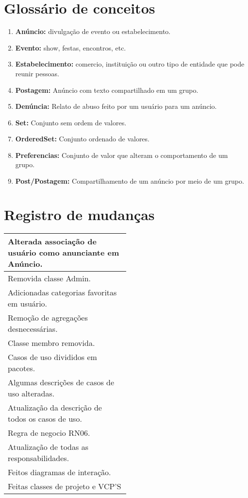 \documentclass{article}
\begin{document}
\section{Glossário de conceitos}
    
\begin{enumerate}[label=\textbf{\arabic*}]
\item \textbf{Anúncio:} divulgação de evento ou estabelecimento.
\item \textbf{Evento:} show, festas, encontros, etc.
\item \textbf{Estabelecimento:} comercio, instituição ou outro tipo de entidade que pode reunir pessoas.
\item \textbf{Postagem:} Anúncio com texto compartilhado em um grupo.
\item \textbf{Denúncia:} Relato de abuso feito por um usuário para um anúncio.
\item \textbf{Set:} Conjunto sem ordem de valores.
\item \textbf{OrderedSet:} Conjunto ordenado de valores.
\item \textbf{Preferencias:} Conjunto de valor que alteram o comportamento de um grupo.
\item \textbf{Post/Postagem:} Compartilhamento de um anúncio por meio de um grupo.
\end{enumerate}

\section{Registro de mudanças}

\begin{center}
 \begin{tabular}{|p{0.5\linewidth}|}
  \hline
  [12/10] Alterada associação de usuário como anunciante em Anúncio.\\ 
  \hline
  [12/10] Removida classe Admin.\\
  \hline
  [12/10] Adicionadas categorias favoritas em usuário.\\
  \hline
  [03/11] Remoção de agregações desnecessárias. \\
  \hline
  [03/11] Classe membro removida. \\
  \hline
  [03/11] Casos de uso divididos em pacotes. \\
  \hline
  [04/11] Algumas descrições de casos de uso alteradas. \\
  \hline
  [05/11] Atualização da descrição de todos os casos de uso. \\
  \hline
  [05/11] Regra de negocio RN06. \\
  \hline
  [05/11] Atualização de todas as responsabilidades. \\
  \hline
  [06/11] Feitos diagramas de interação. \\
  \hline
  [07/11] Feitas classes de projeto e VCP'S \\
  \hline
 \end{tabular} 
\end{center}
\end{document}
